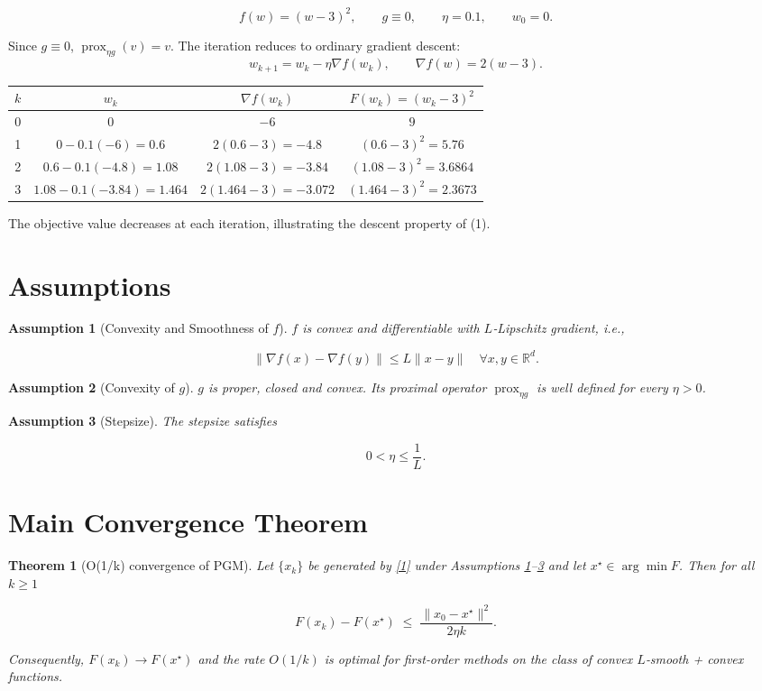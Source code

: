 \documentclass{article}
\newtheorem{theorem}{Theorem}
\newtheorem{assumption}{Assumption}
\newcommand{\prox}{\operatorname{prox}}
\newcommand{\R}{\mathbb{R}}
\begin{document}
\[
f(w)=(w-3)^{2},\qquad g\equiv 0,\qquad \eta=0.1,\qquad w_{0}=0.
\]

Since $g\equiv0$, $\prox_{\eta g}(v)=v$. The iteration reduces to ordinary gradient descent:
\[
w_{k+1}=w_{k}-\eta \nabla f(w_{k}),\qquad 
\nabla f(w)=2(w-3).
\]

\begin{center}
\begin{tabular}{c|c|c|c}
$k$ & $w_{k}$ & $\nabla f(w_{k})$ & $F(w_{k})=(w_{k}-3)^{2}$\\ \hline
0 & $0$ & $-6$ & $9$\\
1 & $0-0.1(-6)=0.6$ & $2(0.6-3)=-4.8$ & $(0.6-3)^{2}=5.76$\\
2 & $0.6-0.1(-4.8)=1.08$ & $2(1.08-3)=-3.84$ & $(1.08-3)^{2}=3.6864$\\
3 & $1.08-0.1(-3.84)=1.464$ & $2(1.464-3)=-3.072$ & $(1.464-3)^{2}=2.3673$
\end{tabular}
\end{center}
The objective value decreases at each iteration, illustrating the descent property of (1).

\newpage
\section*{Assumptions}
\begin{assumption}[Convexity and Smoothness of $f$]\label{as:convexsmooth}
$f$ is convex and differentiable with $L$‑Lipschitz gradient, i.e.,  

\[
\|\nabla f(x)-\nabla f(y)\|\le L\|x-y\|\quad\forall x,y\in\R^{d}.
\tag{3}
\]
\end{assumption}

\begin{assumption}[Convexity of $g$]\label{as:gconvex}
$g$ is proper, closed and convex. Its proximal operator $\prox_{\eta g}$ is well defined for every $\eta>0$.
\end{assumption}

\begin{assumption}[Stepsize]\label{as:stepsize}
The stepsize satisfies  

\[
0<\eta\le \frac{1}{L}.
\tag{4}
\]
\end{assumption}

\section*{Main Convergence Theorem}
\begin{theorem}[O(1/k) convergence of PGM]\label{thm:main}
Let $\{x_{k}\}$ be generated by \eqref{1} under Assumptions \ref{as:convexsmooth}–\ref{as:stepsize} and let $x^{\star}\in\arg\min F$. Then for all $k\ge 1$  

\[
F(x_{k})-F(x^{\star})\;\le\;\frac{\|x_{0}-x^{\star}\|^{2}}{2\eta k}.
\tag{5}
\]

Consequently, $F(x_{k})\to F(x^{\star})$ and the rate $O(1/k)$ is optimal for first‑order methods on the class of convex $L$‑smooth + convex functions.
\end{theorem}
\end{document}
